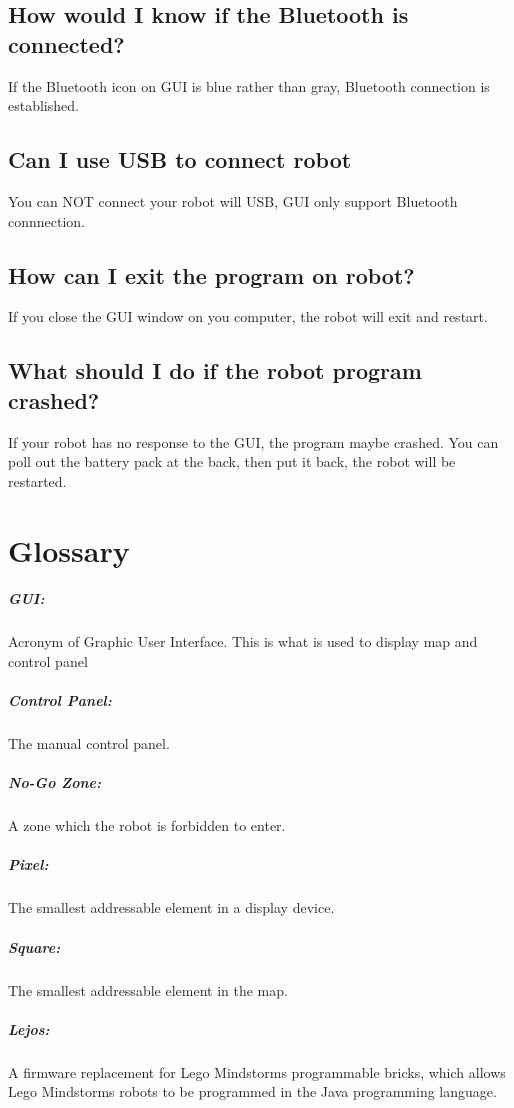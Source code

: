 \documentclass[11pt, a4paper]{report}
\begin{document}
\section{How would I know if the Bluetooth is connected?}
If the Bluetooth icon on GUI is blue rather than gray, Bluetooth connection is established.


\section{Can I use USB to connect robot}
You can NOT connect your robot will USB, GUI only support Bluetooth connnection.

\section{How can I exit the program on robot?}
If you close the GUI window on you computer, the robot will exit and restart.

\section{What should I do if the robot program crashed?}
If your robot has no response to the GUI, the program maybe crashed. You can poll out the battery pack at the back, then put it back, the robot will be restarted.

\chapter{Glossary}


\paragraph{GUI:} Acronym of Graphic User Interface. This is what is used to display map and control panel

\paragraph{Control Panel:} The manual control panel.

\paragraph{No-Go Zone:} A zone which the robot is forbidden to enter.

\paragraph{Pixel:} The smallest addressable element in a display device.

\paragraph{Square:} The smallest addressable element in the map.

\paragraph{Lejos:} A firmware replacement for Lego Mindstorms programmable bricks, which allows Lego Mindstorms robots to be programmed in the Java programming language.


\pagebreak{}
\end{document}
